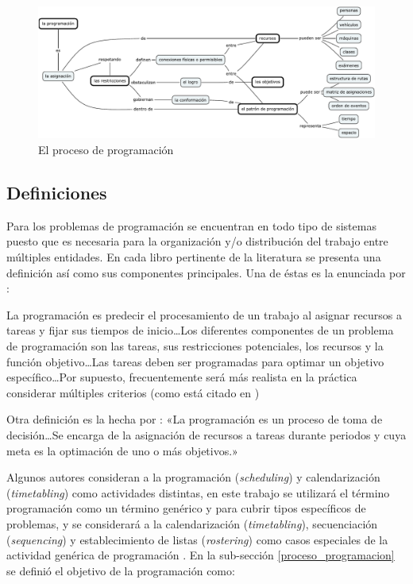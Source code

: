 \documentclass[spanish,draft,12pt,headsepline,footsepline,paper=letter]{scrreprt}
\renewenvironment{quotation}{\list{}{\leftmargin=0.25in}\item[]}{\endlist}
\begin{document}
\begin{figure}[hbtp]
\centering
\includegraphics[width=\textwidth]{media/scheduling_process.pdf}
\caption[El proceso de programación]{El proceso de programación}
\label{fig:scheduling_process}
\end{figure}

\subsection{Definiciones}
\label{Definiciones}

Para \citet[p.~5]{TKindt2002} los problemas de programación se encuentran en todo tipo de sistemas puesto que es necesaria para la organización y/o distribución del trabajo entre múltiples entidades. En cada libro pertinente de la literatura se presenta una definición así como sus componentes principales. Una de éstas es la enunciada por \citet{carlier1988problemes}: 
\begin{quotation}
La programación es predecir el procesamiento de un trabajo al asignar recursos a tareas y fijar sus tiempos de inicio\ldots Los diferentes componentes de un problema de programación son las tareas, sus restricciones potenciales, los recursos y la función objetivo\ldots Las tareas deben ser programadas para optimar un objetivo específico\ldots Por supuesto, frecuentemente será más realista en la práctica considerar múltiples criterios (como está citado en \citealp[p.~6]{TKindt2002}) 
\end{quotation}

Otra definición es la hecha por \citet[p.~1]{Pinedo1995}: «La programación es un proceso de toma de decisión\ldots  Se encarga de la asignación de recursos a tareas durante periodos y cuya meta es la optimación de uno o más objetivos.»

Algunos autores consideran a la programación (\textit{scheduling}) y calendarización (\textit{timetabling}) como actividades distintas, en este trabajo se utilizará el término programación como un término genérico y para cubrir tipos específicos de problemas, y se considerará a la calendarización (\textit{timetabling}), secuenciación (\textit{sequencing}) y establecimiento de listas (\textit{rostering}) como casos especiales de la actividad genérica de programación \citep[p.~47]{wren95scheduling-timetabling}.
%
En la sub-sección \ref{proceso_programacion} se definió el objetivo de la programación como:
\end{document}
